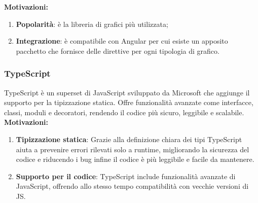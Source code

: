 \textbf{Motivazioni:}
\begin{enumerate}
    \item \textbf{Popolarità}: è la libreria di grafici più utilizzata;
    \item \textbf{Integrazione}: è compatibile con Angular per cui esiste un apposito pacchetto che fornisce delle direttive per ogni tipologia di grafico.
\end{enumerate}


\subsubsection{TypeScript}
\label{subsubsec:typescript}
TypeScript è un superset di JavaScript sviluppato da Microsoft che aggiunge il supporto per la tipizzazione statica. Offre funzionalità avanzate come interfacce, classi, moduli e decoratori, rendendo il codice più sicuro, leggibile e scalabile.\\

\textbf{Motivazioni:}
\begin{enumerate}
    \item \textbf{Tipizzazione statica}: Grazie alla definizione chiara dei tipi TypeScript aiuta a prevenire errori rilevati solo a runtime, migliorando la sicurezza del codice e riducendo i bug infine il codice è più leggibile e facile da mantenere.
    \item \textbf{Supporto per il codice}:  TypeScript include funzionalità avanzate di JavaScript, offrendo allo stesso tempo compatibilità con vecchie versioni di JS.
\end{enumerate}